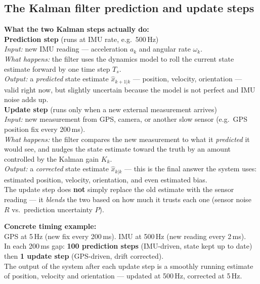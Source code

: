 \documentclass[12pt, a4paper]{article}
\begin{document}
\subsection*{The Kalman filter prediction and update steps}

\begin{notebox}
  \textbf{What the two Kalman steps actually do:}\\[4pt]
  \textbf{Prediction step} (runs at IMU rate, e.g.\ 500\,Hz)\\
  \textit{Input:} new IMU reading --- acceleration $a_k$ and
  angular rate $\omega_k$.\\
  \textit{What happens:} the filter uses the dynamics model to
  roll the current state estimate forward by one time step $T_s$.\\
  \textit{Output:} a \emph{predicted} state estimate
  $\hat{x}_{k+1|k}$ --- position, velocity, orientation ---
  valid right now, but slightly uncertain because the model
  is not perfect and IMU noise adds up.\\[6pt]
  \textbf{Update step} (runs only when a new external measurement arrives)\\
  \textit{Input:} new measurement from GPS, camera, or another
  slow sensor (e.g.\ GPS position fix every 200\,ms).\\
  \textit{What happens:} the filter compares the new measurement
  to what it \emph{predicted} it would see, and nudges the
  state estimate toward the truth by an amount controlled by
  the Kalman gain $K_k$.\\
  \textit{Output:} a \emph{corrected} state estimate
  $\hat{x}_{k|k}$ --- this is the final answer the system uses:
  estimated position, velocity, orientation, and even estimated
  bias.\\[6pt]
  The update step does \textbf{not} simply replace the old estimate
  with the sensor reading --- it \emph{blends} the two based on
  how much it trusts each one (sensor noise $R$ vs.\ prediction
  uncertainty $P$).
\end{notebox}

\begin{notebox}
  \textbf{Concrete timing example:}\\
  GPS at 5\,Hz (new fix every 200\,ms).
  IMU at 500\,Hz (new reading every 2\,ms).\\
  In each 200\,ms gap: \textbf{100 prediction steps} (IMU-driven,
  state kept up to date) then \textbf{1 update step} (GPS-driven,
  drift corrected).\\
  The output of the system after each update step is a smoothly
  running estimate of position, velocity and orientation ---
  updated at 500\,Hz, corrected at 5\,Hz.
\end{notebox}
\end{document}
